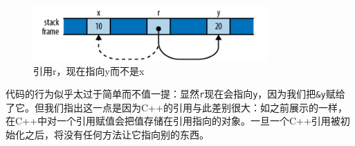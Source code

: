 \begin{figure}[htbp]
    \centering
    \includegraphics[width=0.8\textwidth]{../img/f5-1.png}
    \caption{引用r，现在指向y而不是x}
    \label{f5-1}
\end{figure}

代码的行为似乎太过于简单而不值一提：显然\texttt{r}现在会指向\texttt{y}，因为我们把\texttt{\&y}赋给了它。但我们指出这一点是因为C++的引用与此差别很大：如之前展示的一样，在C++中对一个引用赋值会把值存储在引用指向的对象。一旦一个C++引用被初始化之后，将没有任何方法让它指向别的东西。
















